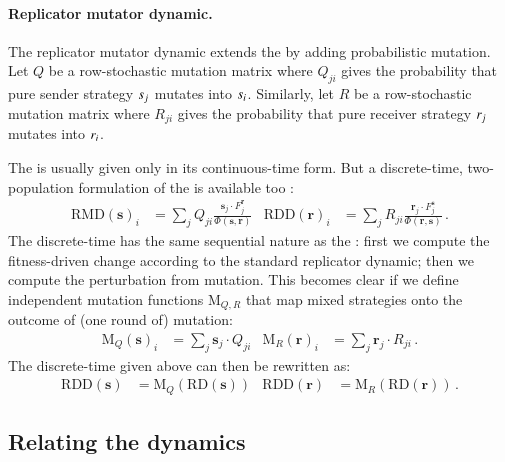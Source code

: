 \documentclass[fleqn,reqno,10pt]{article}
\renewcommand{\Smixed}{\ensuremath{\mathrm{\mathbf{s}}}}
\renewcommand{\Rmixed}{\ensuremath{\mathrm{\mathbf{r}}}}
\newcommand{\rd}{\acro{rd}} %
\newcommand{\rmd}{\acro{rmd}} %
\newcommand{\rdd}{\acro{rdd}} %
\newcommand{\RD}{\ensuremath{\mathrm{RD}}} %
\newcommand{\RDD}{\ensuremath{\mathrm{RDD}}} %
\newcommand{\RMD}{\ensuremath{\mathrm{RMD}}} %
\newcommand{\Mutate}{\ensuremath{\mathrm{M}}} %
\begin{document}
\paragraph{Replicator mutator dynamic.} The replicator mutator dynamic
extends the \rd by adding probabilistic mutation. Let $Q$ be a
row-stochastic mutation matrix where $Q_{ji}$ gives the probability
that pure sender strategy $s_j$ mutates into
$s_i$. Similarly, let $R$ be a row-stochastic mutation matrix
where $R_{ji}$ gives the probability that pure receiver strategy
$r_j$ mutates into $r_i$.

The \rmd is usually given only in its continuous-time form. %
But a discrete-time, two-population formulation of the \rmd is
available too \citep[c.f.][97]{PageNowak2002:Unifying-Evolut}:
\begin{align*}
  \RMD(\Smixed)_i & = \sum_{j} Q_{ji} \frac{\Smixed_j \cdot
    F_j^{\Rmixed}}{ \Phi(\Smixed,\Rmixed)} & \RDD(\Rmixed)_i & =
  \sum_{j} R_{ji} \frac{\Rmixed_j \cdot F_j^{\Smixed}}{
    \Phi(\Rmixed,\Smixed)}\,.
\end{align*}
The discrete-time \rmd has the same sequential nature as the \rdd:
first we compute the fitness-driven change according to the standard
replicator dynamic; then we compute the perturbation from
mutation. This becomes clear if we define independent mutation
functions $\Mutate_{Q,R}$ that map mixed strategies onto the outcome
of (one round of) mutation:
\begin{align}
  \label{eq:Mutation}
  \Mutate_Q(\Smixed)_i & =  \sum_j  \Smixed_j \cdot
  Q_{ji} &   \Mutate_R(\Rmixed)_i & =  \sum_{j}  \Rmixed_j \cdot
  R_{ji} \,.
\end{align}
The discrete-time \rmd given above can then be rewritten as:
\begin{align*}
  \RDD(\Smixed) &= \Mutate_Q(\RD(\Smixed)) &   \RDD(\Rmixed) &= \Mutate_R(\RD(\Rmixed))\,.
\end{align*}

\subsection{Relating the dynamics}
\end{document}
